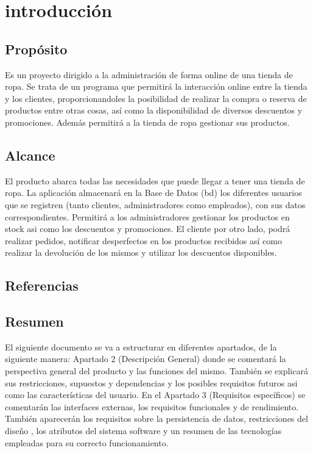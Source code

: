 \section{introducción}
\subsection{Propósito}
Es un proyecto dirigido a la administración de forma online de una tienda de ropa. Se trata de un programa que permitirá la interacción online entre la tienda y los clientes, proporcionandoles la posibilidad de realizar la compra o reserva de productos entre otras cosas, así como la disponibilidad de diversos descuentos y promociones.
Además permitirá a la tienda de ropa gestionar sus productos. 
\subsection{Alcance}
El producto abarca todas las necesidades que puede llegar a tener una tienda de ropa. La aplicación almacenará en la Base de Datos \gls{(bd)} los diferentes usuarios que se registren (tanto clientes, administradores como empleados), con sus datos correspondientes. 
Permitirá a los administradores gestionar los productos en stock asi como los descuentos y promociones. El cliente por otro lado, podrá realizar pedidos, notificar desperfectos en los productos recibidos así como realizar la devolución de los mismos y utilizar los descuentos disponibles. 

\glsaddall
\nocite{*}
{
    \printglossary[title=Definiciones\, acrónimos y abreviaturas, numberedsection]}

\subsection{Referencias}
\subsection{Resumen}
El siguiente documento se va a estructurar en diferentes apartados, de la siguiente manera: Apartado 2 (Descripción General) donde se comentará la perspectiva general del producto y las funciones del mismo. También se explicará sus restricciones, supuestos y dependencias y los posibles requisitos futuros asi como las características del usuario. 
En el Apartado 3 (Requisitos específicos) se comentarán las interfaces externas, los requisitos funcionales y de rendimiento. También aparecerán los requisitos sobre la persistencia de datos, restricciones del diseño , los atributos del sistema software y un resumen de las tecnologías empleadas para su correcto funcionamiento.